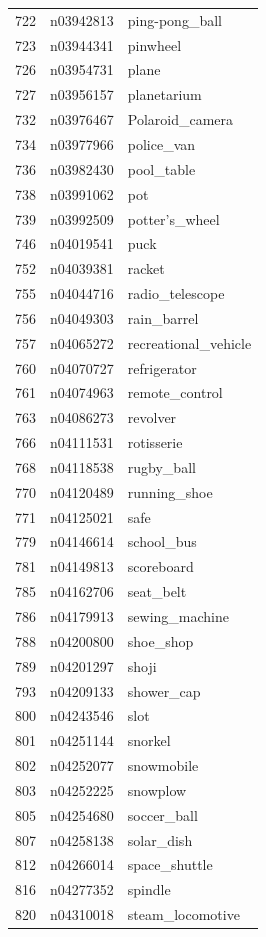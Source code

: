 \begin{table}
\begin{tabular}{cll}
722 & n03942813 & ping-pong_ball \\
723 & n03944341 & pinwheel \\
726 & n03954731 & plane \\
727 & n03956157 & planetarium \\
732 & n03976467 & Polaroid_camera \\
734 & n03977966 & police_van \\
736 & n03982430 & pool_table \\
738 & n03991062 & pot \\
739 & n03992509 & potter's_wheel \\
746 & n04019541 & puck \\
752 & n04039381 & racket \\
755 & n04044716 & radio_telescope \\
756 & n04049303 & rain_barrel \\
757 & n04065272 & recreational_vehicle \\
760 & n04070727 & refrigerator \\
761 & n04074963 & remote_control \\
763 & n04086273 & revolver \\
766 & n04111531 & rotisserie \\
768 & n04118538 & rugby_ball \\
770 & n04120489 & running_shoe \\
771 & n04125021 & safe \\
779 & n04146614 & school_bus \\
781 & n04149813 & scoreboard \\
785 & n04162706 & seat_belt \\
786 & n04179913 & sewing_machine \\
788 & n04200800 & shoe_shop \\
789 & n04201297 & shoji \\
793 & n04209133 & shower_cap \\
800 & n04243546 & slot \\
801 & n04251144 & snorkel \\
802 & n04252077 & snowmobile \\
803 & n04252225 & snowplow \\
805 & n04254680 & soccer_ball \\
807 & n04258138 & solar_dish \\
812 & n04266014 & space_shuttle \\
816 & n04277352 & spindle \\
820 & n04310018 & steam_locomotive \\

\end{tabular}
\end{table}
